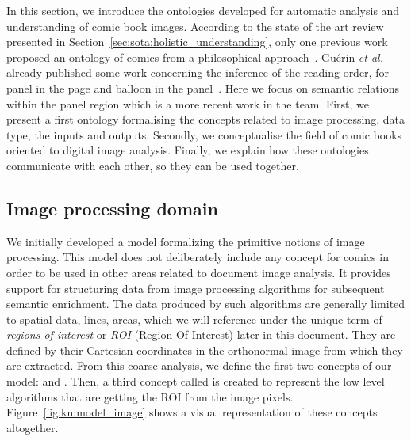 In this section, we introduce the ontologies developed for automatic analysis and understanding of comic book images.
According to the state of the art review presented in Section~\ref{sec:sota:holistic_understanding}, only one previous work proposed an ontology of comics from a philosophical approach~\cite{Aaron2011}.
Gu{\'e}rin \emph{et al.} already published some work concerning the inference of the reading order, for panel in the page and balloon in the panel~\cite{Guerin2012Ontologies,phdthesisGuerin14}.
Here we focus on semantic relations within the panel region which is a more recent work in the team.
First, we present a first ontology formalising the concepts related to image processing, data type, the inputs and outputs.
Secondly, we conceptualise the field of comic books oriented to digital image analysis.
Finally, we explain how these ontologies communicate with each other, so they can be used together.

\subsection{Image processing domain} %
\label{sub:kn:image_processing_domain}

We initially developed a model formalizing the primitive notions of image processing.
This model does not deliberately include any concept for comics in order to be used in other areas related to document image analysis.
It provides support for structuring data from image processing algorithms for subsequent semantic enrichment.
The data produced by such algorithms are generally limited to spatial data, lines, areas, which we will reference under the unique term of \textit{regions of interest} or \textit{ROI} (Region Of Interest) later in this document.
They are defined by their Cartesian coordinates in the orthonormal image from which they are extracted.
From this coarse analysis, we define the first two concepts of our model:  and .
Then, a third concept called  is created to represent the low level algorithms that are getting the ROI from the image pixels.
Figure~\ref{fig:kn:model_image} shows a visual representation of these concepts altogether.

